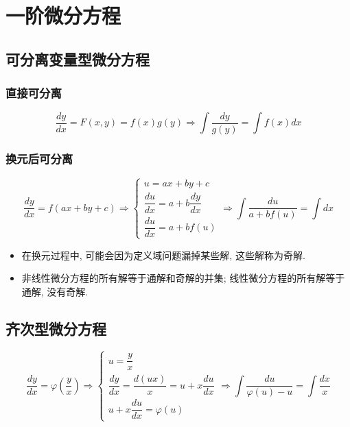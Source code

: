 \section{一阶微分方程}

\subsection{可分离变量型微分方程}\label{def: 分离变量型一阶微分方程}
\subsubsection{直接可分离}
$$\dfrac{dy}{dx} = F(x,y)=f(x)g(y)\Rightarrow \int \dfrac{dy}{g(y)} = \int f(x)dx$$
\subsubsection{换元后可分离}

$$\dfrac{dy}{dx} = f(ax+by+c)\Rightarrow 
\begin{cases}
	u = ax +by +c\\
	\dfrac{du}{dx} = a + b\dfrac{dy}{dx}\\
	\dfrac{du}{dx} = a + bf(u)
\end{cases}\Rightarrow \int \dfrac{du}{a + bf(u)} = \int dx$$
\begin{anymark}[注]
	\begin{itemize}
		\item 在换元过程中, 可能会因为定义域问题漏掉某些解, 这些解称为奇解.
		\item 非线性微分方程的所有解等于通解和奇解的并集; 线性微分方程的所有解等于通解, 没有奇解.
	\end{itemize}
\end{anymark}

\subsection{齐次型微分方程}
$$\dfrac{dy}{dx} = \varphi(\dfrac{y}{x})\Rightarrow 
\begin{cases}
	u = \dfrac{y}{x}\\
	\dfrac{dy}{dx} = \dfrac{d(ux)}{x} = u + x\dfrac{du}{dx}\\
	u + x\dfrac{du}{dx} = \varphi(u)
\end{cases}\Rightarrow \int \dfrac{du}{\varphi(u) - u} =\int \dfrac{dx}{x} $$

